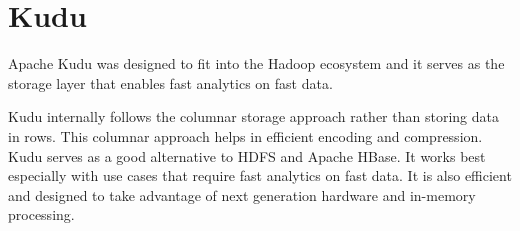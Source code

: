 \section{Kudu}

Apache Kudu was designed to fit into the Hadoop ecosystem and it 
serves as the storage layer that enables fast analytics on fast 
data. \cite{hid-sp18-517-ApacheKudu}

Kudu internally follows the columnar storage approach rather than 
storing data in rows. This columnar approach helps in efficient 
encoding and compression. Kudu serves as a good alternative to HDFS 
and Apache HBase. It works best especially with use cases that 
require fast analytics on fast data. It is also efficient and 
designed to take advantage of next generation hardware and 
in-memory processing. \cite{hid-sp18-517-ApacheKudu}



